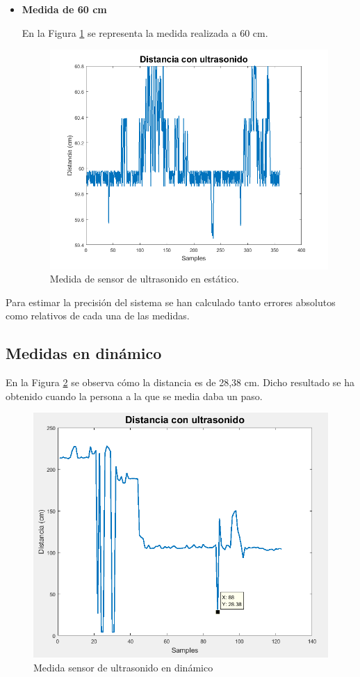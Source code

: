 \begin{itemize}
\begin{figure}[H]
	\end{figure}
	
	\item \textbf{Medida de 60 cm}
	
	En la Figura \ref{fig:ultra60} se representa la medida realizada a 60 cm. 
	\begin{figure}[H]
		\centering
		\includegraphics[width=16 cm,height=8 cm]{./graphics/60}
		\caption{Medida de sensor de ultrasonido en estático.} \label{fig:ultra60}
		
	\end{figure}
	
\end{itemize}

Para estimar la precisión del sistema se han calculado tanto errores absolutos como relativos de cada una de las medidas.


\subsection{Medidas en dinámico}

En la Figura \ref{fig:ultrasonido_corto} se observa cómo la distancia es de 28,38 cm. Dicho resultado se ha obtenido cuando la persona a la que se media daba un paso.

\begin{figure}[H]
	\centering
	\includegraphics[width=16 cm,height=8 cm]{./graphics/ultrasonido_corto}
	\caption{Medida sensor de ultrasonido en dinámico} \label{fig:ultrasonido_corto}
	
\end{figure}

